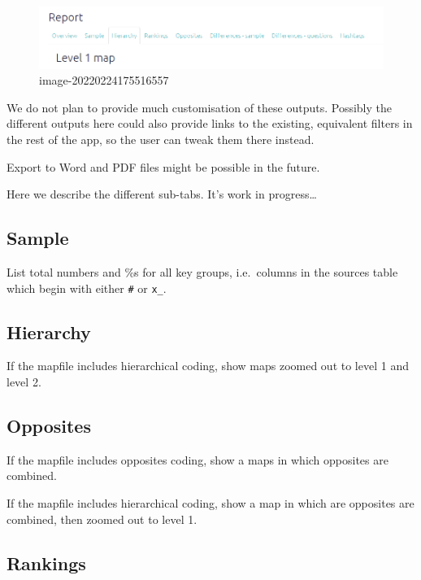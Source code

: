 \documentclass[
]{book}
\begin{document}
\begin{figure}
\centering
\includegraphics{_assets/image-20220224175516557.png}
\caption{image-20220224175516557}
\end{figure}

We do not plan to provide much customisation of these outputs. Possibly the different outputs here could also provide links to the existing, equivalent filters in the rest of the app, so the user can tweak them there instead.

Export to Word and PDF files might be possible in the future.

Here we describe the different sub-tabs. It's work in progress\ldots{}

\hypertarget{sample}{%
\subsection{Sample}\label{sample}}

List total numbers and \%s for all key groups, i.e.~columns in the sources table which begin with either \texttt{\#} or \texttt{x\_}.

\hypertarget{hierarchy-1}{%
\subsection{Hierarchy}\label{hierarchy-1}}

If the mapfile includes hierarchical coding, show maps zoomed out to level 1 and level 2.

\hypertarget{opposites}{%
\subsection{Opposites}\label{opposites}}

If the mapfile includes opposites coding, show a maps in which opposites are combined.

If the mapfile includes hierarchical coding, show a map in which are opposites are combined, then zoomed out to level 1.

\hypertarget{rankings}{%
\subsection{Rankings}\label{rankings}}
\end{document}
